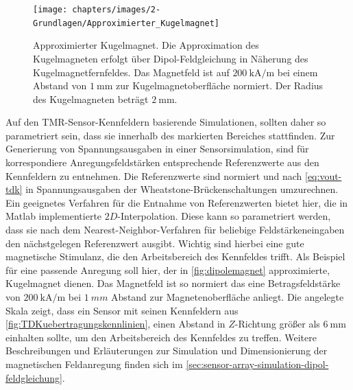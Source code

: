 \vspace{5mm}
\begin{figure}[tph]
	\centering
	\texttt{[image: chapters/images/2-Grundlagen/Approximierter\_Kugelmagnet]}
	\caption[Approximierter Kugelmagnet]{Approximierter Kugelmagnet. Die Approximation des Kugelmagneten erfolgt 
		über Dipol-Feldgleichung in Näherung des Kugelmagnetfernfeldes. Das Magnetfeld ist auf 
		$\SI{200}{\kilo\ampere\per\metre}$ bei einem Abstand von $\SI{1}{\milli\metre}$ zur Kugelmagnetoberfläche 
		normiert. Der Radius des Kugelmagneten beträgt $\SI{2}{\milli\metre}$.}
	\label{fig:dipolemagnet}
\end{figure}


Auf den TMR-Sensor-Kennfeldern basierende Simulationen, sollten daher so parametriert sein, dass sie innerhalb des markierten Bereiches stattfinden. Zur Generierung von Spannungsausgaben in einer Sensorsimulation, sind für korrespondiere Anregungsfeldstärken entsprechende Referenzwerte aus den Kennfeldern zu entnehmen. Die  Referenzwerte sind normiert und nach \autoref{eq:vout-tdk} in Spannungsausgaben der Wheatstone-Brückenschaltungen umzurechnen. Ein geeignetes Verfahren für die Entnahme von Referenzwerten bietet hier, die in Matlab implementierte $2D$-Interpolation. Diese kann so parametriert werden, dass sie nach dem Nearest-Neighbor-Verfahren für beliebige Feldstärkeneingaben den nächstgelegen Referenzwert ausgibt. Wichtig sind hierbei eine gute magnetische Stimulanz, die den Arbeitsbereich des Kennfeldes trifft. Als Beispiel für eine passende Anregung soll hier, der in \autoref{fig:dipolemagnet} approximierte, Kugelmagnet dienen. Das Magnetfeld ist so normiert das eine Betragsfeldstärke von $\SI{200}{\kilo\ampere\per\metre}$ bei $\SI{1}{mm}$ Abstand zur Magnetenoberfläche anliegt. Die angelegte Skala zeigt, dass ein Sensor mit seinen Kennfeldern aus \autoref{fig:TDKuebertragungskennlinien}, einen Abstand in $Z$-Richtung größer als $\SI{6}{\milli\metre}$ einhalten sollte, um den Arbeitsbereich des Kennfeldes zu treffen. Weitere Beschreibungen und Erläuterungen zur Simulation und Dimensionierung der magnetischen Feldanregung finden sich im \autoref{sec:sensor-array-simulation-dipol-feldgleichung}.



